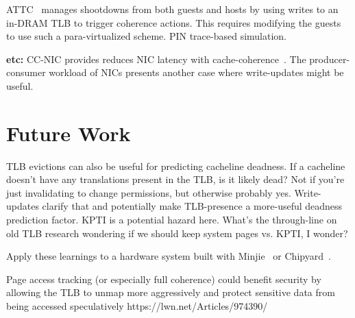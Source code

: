 ATTC~\cite{gugale_attc_2020} manages shootdowns from both guests and hosts by using writes to an in-DRAM TLB to trigger coherence actions. This requires modifying the guests to use such a para-virtualized scheme. PIN trace-based simulation.

\textbf{etc:} CC-NIC provides reduces NIC latency with cache-coherence~\cite{schuh_cc-nic_2024}. The producer-consumer workload of NICs presents another case where write-updates might be useful.

\section{Future Work}

TLB evictions can also be useful for predicting cacheline deadness. If a cacheline doesn't have any translations present in the TLB, is it likely dead? Not if you're just invalidating to change permissions, but otherwise probably yes. Write-updates clarify that and potentially make TLB-presence a more-useful deadness prediction factor. KPTI is a potential hazard here. What's the through-line on old TLB research \cite{clark_performance_1985} wondering if we should keep system pages vs. KPTI, I wonder?

Apply these learnings to a hardware system built with Minjie~\cite{xu_towards_2022} or Chipyard~\cite{amid_chipyard_2020}.

Page access tracking (or especially full coherence) could benefit security by allowing the TLB to unmap more aggressively and protect sensitive data from being accessed speculatively https://lwn.net/Articles/974390/

\endinput
